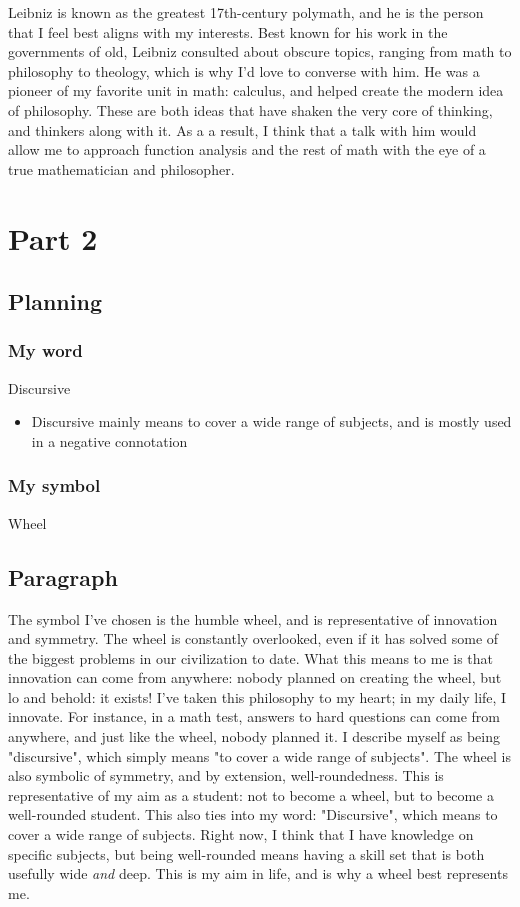 \documentclass[]{article}
\begin{document}
Leibniz is known as the greatest 17th-century polymath, and he is the person that I feel best aligns with my interests. Best known for his work in the governments of old, Leibniz consulted about obscure topics, ranging from math to philosophy to theology, which is why I'd love to converse with him. 
He was a pioneer of my favorite unit in math: calculus, and helped create the modern idea of philosophy. These are both ideas that have shaken the very core of thinking, and thinkers along with it. As a a result, I think that a talk with him would allow me to approach function analysis and the rest of math with the eye of a true mathematician and philosopher.

\newpage

\section*{Part 2}
\subsection*{Planning}
\subsubsection*{My word}
Discursive
\begin{itemize}
    \item Discursive mainly means to cover a wide range of subjects, and is mostly used in a negative connotation
\end{itemize}
\subsubsection*{My symbol}
Wheel



\newpage

\subsection*{Paragraph}
The symbol I've chosen is the humble wheel, and is representative of innovation and symmetry. The wheel is constantly overlooked, even if it has solved some of the biggest problems in our civilization to date. What this means to me is that innovation can come from anywhere: nobody planned on creating the wheel, but lo and behold: it exists! I've taken this philosophy to my heart; in my daily life, I innovate. For instance, in a math test, answers to hard questions can come from anywhere, and just like the wheel, nobody planned it. I describe myself as being "discursive", which simply means "to cover a wide range of subjects". The wheel is also symbolic of symmetry, and by extension, well-roundedness. This is representative of my aim as a student: not to become a wheel, but to become a well-rounded student. This also ties into my word: "Discursive", which means to cover a wide range of subjects. Right now, I think that I have knowledge on specific subjects, but being well-rounded means having a skill set that is both usefully wide \textit{and} deep. This is my aim in life, and is why a wheel best represents me.
\end{document}
